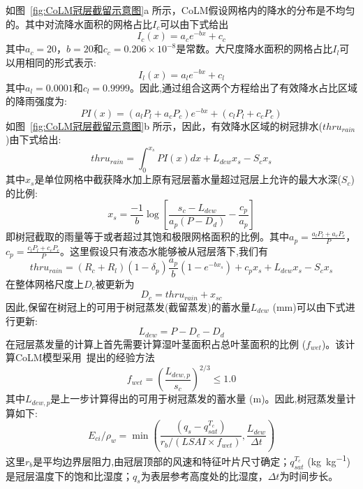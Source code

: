 如图~\ref{fig:CoLM冠层截留示意图}a 所示，CoLM假设网格内的降水的分布是不均匀的。其中对流降水面积的网格占比$I_c$可以由下式给出
\begin{equation}
I_{c}(x)=a_{c} e^{-bx}+c_{c}
\end{equation}
其中$a_c=20$，$b=20$和$c_c=0.206\times10^{-8}$是常数。大尺度降水面积的网格占比$I_l$可以用相同的形式表示:
\begin{equation}
I_{l}(x)=a_{l} e^{-b x}+c_{l}
\end{equation}
其中$a_l=0.0001$和$c_l=0.9999$。因此,通过组合这两个方程给出了有效降水占比区域的降雨强度为:
\begin{equation}
P I(x)=\left(a_{l} P_{l}+a_{c} P_{c}\right) e^{-b x}+\left(c_{l} P_{l}+c_{c} P_{c}\right)
\end{equation}
如图~\ref{fig:CoLM冠层截留示意图}b 所示，因此，有效降水区域的树冠排水($thru_{rain}$)由下式给出:
\begin{equation}
thru_{rain}=\int_{0}^{x_{s}} P I(x) d x+L_{dew} x_{s}-S_{c} x_{s}
\end{equation}
其中$x_s$是单位网格中截获降水加上原有冠层蓄水量超过冠层上允许的最大水深($S_c$)的比例:
\begin{equation}
x_{s}=\frac{-1}{b} \log \left[\frac{s_{c}-L_{d e w}}{a_{p}\left(P-D_{d}\right)}-\frac{c_{p}}{a_{p}}\right]
\end{equation}
即树冠截取的雨量等于或者超过其饱和极限网格面积的比例。其中$a_p=\frac{a_lP_l+a_cP_c}{P}$，$c_p=\frac{c_lP_l+c_cP_c}{P}$。这里假设只有液态水能够被从冠层落下,我们有
\begin{equation}
thru_{rain}=\left(R_{c}+R_{l}\right)\left(1-\delta_{p}\right) \frac{a_{p}}{b}\left(1-e^{-b x_{s}}\right)+c_{p} x_{s}+L_{dew} x_{s}-S_{c} x_{s}
\end{equation}
在整体网格尺度上$D_c$被更新为
\begin{equation}
D_c=thru_{r a i n}+x_{s c}
\end{equation}
因此,保留在树冠上的可用于树冠蒸发(截留蒸发)的蓄水量$L_{dew}$ (mm)可以由下式进行更新:
\begin{equation}
L_{dew}={P}-D_{c}-D_{d}
\end{equation}
在冠层蒸发量的计算上首先需要计算湿叶茎面积占总叶茎面积的比例 ($f_{wet}$)。该计算CoLM模型采用~\citet{dickinson1993biosphere}提出的经验方法
\begin{equation}
f_{{wet}}=\left(\frac{L_{dew, p}}{s_{c}}\right)^{2 / 3} \leqslant 1.0
\end{equation}
其中$L_{dew, p}$是上一步计算得出的可用于树冠蒸发的蓄水量 (m)。因此,树冠蒸发量计算如下:
\begin{equation}
E_{ci} / \rho_{w}=\min \left(\frac{\left(q_{s}-q_{sat}^{T_{c}}\right)}{r_{b} /\left(LSAI \times f_{wet}\right)}, \frac{L_{dew}}{\Delta t}\right)
\end{equation}
这里$r_b$是平均边界层阻力,由冠层顶部的风速和特征叶片尺寸确定；$q_{sat}^{T_c}$ (\unit{kg kg^{-1}})是冠层温度下的饱和比湿度；$q_s$为表层参考高度处的比湿度，$\Delta t$为时间步长。


